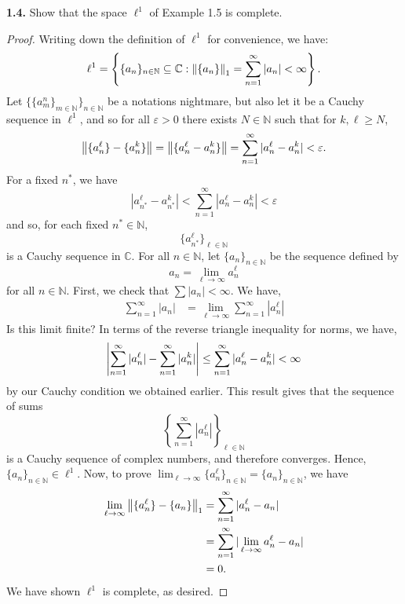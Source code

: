 \documentclass[12pt]{article}
\theoremstyle{definition}
\begin{document}
	\newpage 
	\noindent \textbf{1.4.} Show that the space $\ell^1$ of Example 1.5 is complete. 
		\begin{proof}
			Writing down the definition of $\ell^1$ for convenience, we have:
				$$\ell^1 = \left\{\{a_n\}_{n \in \mathbb{N}} \subseteq \mathbb{C} : \norm{\{a_n\}}_1 = \sum_{n = 1}^\infty |a_n| < \infty \right\}.$$ 
			Let $\{\{a_m^n\}_{m \in \mathbb{N}}\}_{n \in \mathbb{N}}$ be a notations nightmare, but also let it be a Cauchy sequence in $\ell^1$, and so for all $\varepsilon > 0$ there exists $N \in \mathbb{N}$ such that for $k, \ell \geq N$, $$\norm{\{a_n^\ell\} - \{a_n^k\}} =  \norm{\{a_n^\ell - a_n^k\}} = \sum_{n = 1}^\infty |a_n^\ell - a_n^k| < \varepsilon.$$ For a fixed $n^\ast$, we have $$|a_{n^\ast}^\ell - a_{n^\ast}^k| < \sum_{n = 1}^\infty |a_n^\ell - a_n^k| < \varepsilon$$ and so, for each fixed $n^\ast \in \mathbb{N}$, $$\{a_{n^\ast}^\ell\}_{\ell \in \mathbb{N} }$$ is a Cauchy sequence in $\mathbb{C}$. For all $n \in \mathbb{N}$, let $\{a_n\}_{n \in \mathbb{N}}$ be the sequence defined by $$a_n = \lim_{\ell \to \infty} a_n^\ell$$ for all $n \in \mathbb{N}.$ First, we check that $\sum |a_n| < \infty$. We have,
				\begin{align*}
					\sum_{n = 1}^\infty |a_n| &= \lim_{\ell \to \infty}\sum_{n = 1}^\infty |a_n^\ell| 
				\end{align*} 
			Is this limit finite? In terms of the reverse triangle inequality for norms, we have, $$\abs{\sum_{n = 1}^\infty |a_n^\ell| - \sum_{n = 1}^\infty |a_n^k|} \leq \sum_{n = 1}^\infty |a_n^\ell - a_n^k| < \infty$$ by our Cauchy condition we obtained earlier. This result gives that the sequence of sums $$\left\{\sum_{n = 1}^\infty |a_n^\ell|\right\}_{\ell \in \mathbb{N}}$$ is a Cauchy sequence of complex numbers, and therefore converges. Hence, $\{a_n\}_{n \in \mathbb{N}} \in \ell^1$. Now, to prove $\lim_{\ell \to \infty} \{a_n^\ell\}_{n \in \mathbb{N}} = \{a_n\}_{n \in \mathbb{N}}$, we have
				\begin{align*}
					\lim_{\ell \to \infty} \norm{\{a_n^\ell\} - \{a_n\}}_1 &= \sum_{n = 1}^\infty |a_n^\ell - a_n| \\
					&= \sum_{n = 1}^\infty |\lim_{\ell \to \infty} a_n^\ell - a_n| \\
					&= 0.
				\end{align*}
			We have shown $\ell^1$ is complete, as desired. 
		\end{proof} 
\end{document}
